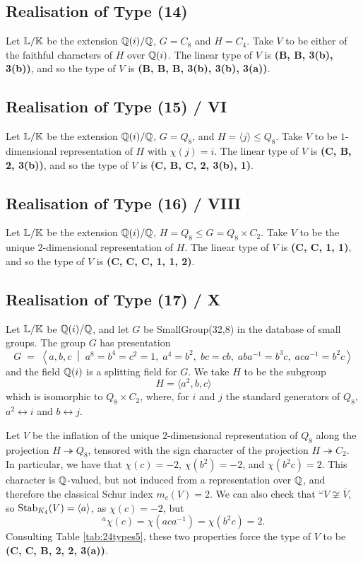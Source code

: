 \subsection{Realisation of Type (14)}

Let ${\mathbb L} / {\mathbb K}$ be the extension ${\mathbb Q}(i) / {\mathbb Q}$, $G = C_8$ and $H = C_4$. Take $V$ to be either of the faithful characters of $H$ over ${\mathbb Q}(i)$. The linear type of $V$ is \textbf{(B, B, 3(b), 3(b))}, and so the type of $V$ is \textbf{(B, B, B, 3(b), 3(b), 3(a))}.

\subsection{Realisation of Type (15) / VI}

Let ${\mathbb L} / {\mathbb K}$ be the extension ${\mathbb Q}(i) / {\mathbb Q}$, $G = Q_8$, and $H = \langle j \rangle \leq Q_8$. Take $V$ to be $1$-dimensional representation of $H$ with $\chi(j) = i$. The linear type of $V$ is \textbf{(C, B, 2, 3(b))}, and so the type of $V$ is \textbf{(C, B, C, 2, 3(b), 1)}.

\subsection{Realisation of Type (16) / VIII}

Let ${\mathbb L} / {\mathbb K}$ be the extension ${\mathbb Q}(i) / {\mathbb Q}$, $H = Q_8 \leq G = Q_8 \times C_2$. Take $V$ to be the unique $2$-dimensional representation of $H$. The linear type of $V$ is \textbf{(C, C, 1, 1)}, and so the type of $V$ is \textbf{(C, C, C, 1, 1, 2)}.

\subsection{Realisation of Type (17) / X}

Let ${\mathbb L} / {\mathbb K}$ be ${\mathbb Q}(i) / {\mathbb Q}$, and let $G$ be SmallGroup(32,8) in the database of small groups. The group $G$ has presentation
\[
G \;=\;
\left\langle 
  a, b, c \;\middle|\;
  a^{8} = b^{4} = c^{2} = 1,\;
  a^{4} = b^{2},\;
  bc = cb,\;
  a b a^{-1} = b^{3} c,\;
  a c a^{-1} = b^{2} c
\right\rangle
\]
and the field ${\mathbb Q}(i)$ is a splitting field for $G$. We take $H$ to be the subgroup
\[
H = \langle a^2 , b, c \rangle
\]
which is isomorphic to $Q_8 \times C_2$, where, for $i$ and $j$ the standard generators of $Q_8$, $a^2 \leftrightarrow i$ and $b \leftrightarrow j$.

Let $V$ be the inflation of the unique $2$-dimensional representation of $Q_8$ along the projection $H \twoheadrightarrow Q_8$, tensored with the sign character of the projection $H \twoheadrightarrow C_2$. In particular, we have that $\chi(c) = -2$, $\chi(b^2) = -2$, and $\chi(b^2 c) = 2$. This character is ${\mathbb Q}$-valued, but not induced from a representation over ${\mathbb Q}$, and therefore the classical Schur index $m_c(V) = 2$. We can also check that ${}^{\omega} V \not\cong \overline{V}$, so $\operatorname{Stab}_{K_4}(V) = \langle a \rangle$, as $\chi(c) = -2$, but 
\[
{}^{a}\chi(c) = \chi(aca^{-1}) = \chi(b^2 c) = 2.
\] 
Consulting Table \ref{tab:24types5}, these two properties force the type of $V$ to be \textbf{(C, C, B, 2, 2, 3(a))}.

